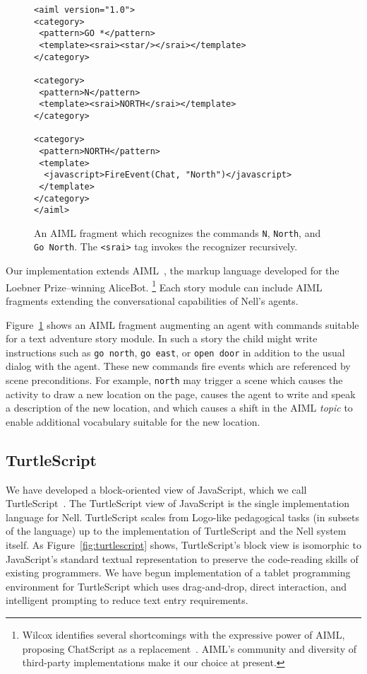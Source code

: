 \documentclass[preprint]{sig-alternate}
\begin{document}
\begin{figure}\small
\begin{verbatim}
<aiml version="1.0">
<category>
 <pattern>GO *</pattern>
 <template><srai><star/></srai></template>
</category>

<category>
 <pattern>N</pattern>
 <template><srai>NORTH</srai></template>
</category>

<category>
 <pattern>NORTH</pattern>
 <template>
  <javascript>FireEvent(Chat, "North")</javascript>
 </template>
</category>
</aiml>
\end{verbatim}
\caption{An AIML fragment which recognizes the commands \texttt{N},
  \texttt{North}, and \texttt{Go North}. The \texttt{<srai>} tag invokes the
  recognizer recursively.}\label{fig:aiml}
\end{figure}

Our implementation extends AIML~\cite{aiml:2005},
the markup language developed for the Loebner Prize--winning
AliceBot.%
\footnote{Wilcox identifies several shortcomings with the expressive
  power of AIML, proposing ChatScript as a
  replacement~\cite{wilcox:2010}.  AIML's community and
  diversity of third-party implementations make it our choice at present.}
Each story module can include AIML fragments extending the
conversational capabilities of Nell's agents.

Figure~\ref{fig:aiml}
shows an AIML fragment augmenting an agent with
commands suitable for a text adventure story module.
In such a story the child might write instructions such as
\texttt{go north}, \texttt{go east}, or \texttt{open door} in
addition to the usual dialog with the agent.
These new commands fire events which are referenced by scene
preconditions.  For example, \texttt{north} may
trigger a scene which causes the activity to draw a new location on
the page, causes the agent to write and speak a description of the new
location, and which causes a shift in the AIML \textit{topic} to
enable additional vocabulary suitable for the new location.


\subsection{TurtleScript}\label{sec:turtles}

We have developed a block-oriented view of JavaScript, which we call
TurtleScript~\cite{turtlescript}.
The TurtleScript view of JavaScript is the single
implementation language for Nell.  TurtleScript scales from Logo-like
pedagogical tasks (in subsets of the language) up to the
implementation of TurtleScript and the
Nell system itself.  As Figure~\ref{fig:turtlescript} shows,
TurtleScript's block view is isomorphic to
JavaScript's standard textual
representation to preserve the code-reading skills of existing
programmers.  We have begun implementation of a
tablet programming environment for TurtleScript which uses
drag-and-drop, direct interaction, and intelligent prompting to reduce
text entry requirements.
\end{document}
